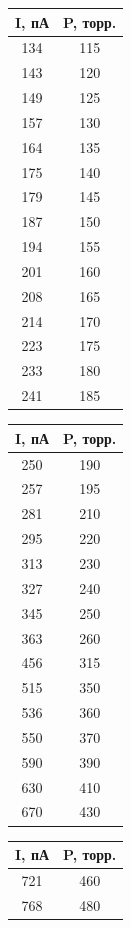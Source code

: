 \documentclass[a4paper,14pt]{extarticle}
\begin{document}
\begin{table}[h!]
\begin{tabular}{|c|c|}
		\end{tabular}
		\begin{tabular}{|c|c|}
			\hline
			I, пА & P, торр. \\ \hline
			134	&	115	\\ \hline
			143	&	120	\\ \hline
			149	&	125	\\ \hline
			157	&	130	\\ \hline
			164	&	135	\\ \hline
			175	&	140	\\ \hline
			179	&	145	\\ \hline
			187	&	150	\\ \hline
			194	&	155	\\ \hline
			201	&	160	\\ \hline
			208	&	165	\\ \hline
			214	&	170	\\ \hline
			223	&	175	\\ \hline
			233	&	180	\\ \hline
			241	&	185	\\ \hline
		\end{tabular}
		\begin{tabular}{|c|c|}
			\hline
			I, пА & P, торр. \\ \hline
			250	&	190	\\ \hline
			257	&	195	\\ \hline
			281	&	210	\\ \hline
			295	&	220	\\ \hline
			313	&	230	\\ \hline
			327	&	240	\\ \hline
			345	&	250	\\ \hline
			363	&	260	\\ \hline
			456	&	315	\\ \hline
			515	&	350	\\ \hline
			536	&	360	\\ \hline
			550	&	370	\\ \hline
			590	&	390	\\ \hline
			630	&	410	\\ \hline
			670	&	430	\\ \hline
			\end{tabular}
			\begin{tabular}{|c|c|}
			\hline
			I, пА & P, торр. \\ \hline
			721	&	460	\\ \hline
			768	&	480	\\ \hline

\end{tabular}
\end{table}
\end{document}
